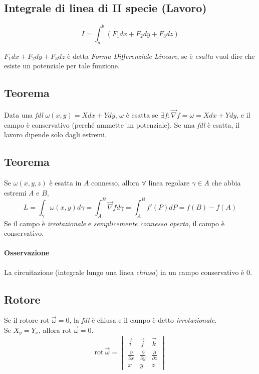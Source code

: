 \documentclass[10pt,a4paper,fleqn]{article}
\begin{document}
	\subsection{Integrale di linea di II specie (Lavoro)}

	\begin{equation}
	I=\int_a^b(F_1dx + F_2dy + F_3dz)
	\end{equation}

	$F_1dx + F_2dy + F_3dz$ è detta \emph{Forma Differenziale Lineare}, se è \emph{esatta} vuol dire che esiste un potenziale per tale funzione.

	\subsection{Teorema}

	Data una \emph{fdl} $\omega(x,y)=Xdx+Ydy$, $\omega$ è esatta se $\exists f: \vec{\nabla}f=\omega=Xdx+Ydy$, e il campo è conservativo (perché ammette un potenziale). Se una \emph{fdl} è esatta, il lavoro dipende solo dagli estremi.

	\subsection{Teorema}

	Se $\omega(x,y,z)$ è esatta in $A$ connesso, allora $\forall$ linea regolare $\gamma\in A$ che abbia estremi $A$ e $B$,
	\begin{equation}
	L=\int_{\gamma}\omega(x,y)d\gamma = \int_A^B\vec{\nabla}fd\gamma=\int_A^B f'(P)dP=f(B)-f(A)
	\end{equation}
	Se il campo è \emph{irrotazionale} e \emph{semplicemente connesso aperto}, il campo è conservativo.
	\paragraph{Osservazione} La circuitazione (integrale lungo una linea \emph{chiusa}) in un campo conservativo è $0$.

	\subsection{Rotore}

	Se il rotore rot $\vec\omega=0$, la \emph{fdl} è chiusa e il campo è detto \emph{irrotazionale}. \\Se $X_y = Y_x$, allora rot $ \vec\omega = 0$.
	\begin{equation}
	\text{rot}\:\vec\omega=\begin{vmatrix}
	\vec i & \vec j & \vec k\\
	\frac{\partial}{\partial x} & 	\frac{\partial}{\partial y} & \frac{\partial}{\partial z}\\
	x & y & z
	\end{vmatrix}
	\end{equation}
\end{document}
